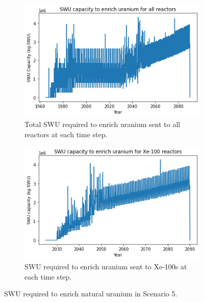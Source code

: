 \begin{figure}
    \centering
    \begin{subfigure}{0.5\textwidth}
        \centering
        \includegraphics[scale=0.5]{../figures/totalswu_scenarios_5.png}
        \caption{Total \gls{SWU} required to enrich uranium sent to all reactors at each time step.}
        \label{fig:totalswu_5}
    \end{subfigure}
    \hspace{0.8cm}
    \begin{subfigure}{0.5\textwidth}
        \centering
        \includegraphics[scale=0.5]{../figures/haleuSWU_scenarios_5.png}
        \caption{\gls{SWU} required to enrich uranium sent to Xe-100s at each time step.}
        \label{fig:haleuswu_5}
    \end{subfigure}
    \caption{\gls{SWU} required to enrich natural uranium in Scenario 5.}
    \label{fig:swu_5}
\end{figure}

